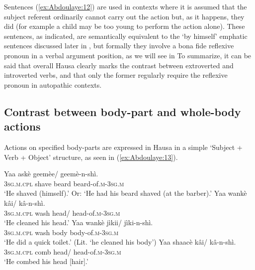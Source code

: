 \documentclass[output=paper]{langscibook}
\begin{document}
  

Sentences (\ref{ex:Abdoulaye:12}) are used in contexts where it is assumed that the subject referent ordinarily cannot carry out the action but, as it happens, they did (for example a child may be too young to perform the action alone). These sentences, as indicated, are semantically equivalent to the ‘by himself’ emphatic sentences discussed later in , but formally they involve a bona fide reflexive pronoun in a verbal argument position, as we will see in  To summarize, it can be said that overall Hausa clearly marks the contrast between extroverted and introverted verbs, and that only the former regularly require the reflexive pronoun in autopathic contexts. 

\subsection{Contrast between body-part and whole-body actions} \label{sec:Abdoulaye:3.4}

Actions on specified body-parts are expressed in Hausa in a simple ‘Subject + Verb + Object’  structure, as seen in (\ref{ex:Abdoulaye:13}). 

\ea%
    \label{ex:Abdoulaye:13}
    \ea \label{ex:Abdoulaye:13a}
    \gll Yaa  askè  geemèe/  geemè-n-shì.\\
    \textsc{3sg.m.cpl}  shave  beard  beard-of.\textsc{m-3sg.m}\\
    \glt `He shaved (himself).’ Or: ‘He had his beard shaved (at the barber).’
    \ex \label{ex:Abdoulaye:13b}
    \gll Yaa  wankè  kâi/  kâ-n-shì.\\
    \textsc{3sg.m.cpl}  wash  head/  head-of.\textsc{m-3sg.m}\\
     \glt `He cleaned his head.’
    \ex \label{ex:Abdoulaye:13c}
    \gll Yaa  wankè  jìkii/  jìki-n-shì.\\
    \textsc{3sg.m.cpl}  wash  body  body-of.\textsc{m-3sg.m}\\
     \glt `He did a quick toilet.’ (Lit. ‘he cleaned his body’)
    \ex \label{ex:Abdoulaye:13d}
    \gll Yaa  shaacè  kâi/  kâ-n-shì.\\
    \textsc{3sg.m.cpl}  comb  head/  head-of.\textsc{m-3sg.m}\\
     \glt `He combed his head [hair].’
     \z
\z 
\end{document}
